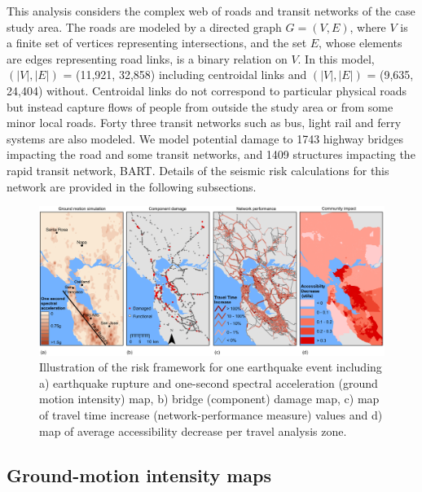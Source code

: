 This analysis considers the complex web of roads and transit networks of the case study area. The roads are modeled by a directed graph $G = (V, E)$, where $V$ is a finite set of vertices representing intersections, and the set $E$, whose elements are edges representing road links, is a binary relation on $V$. In this model, $(|V|, |E|)$ = (11,921, 32,858) including centroidal links and $(|V|, |E|)$ = (9,635, 24,404) without. Centroidal links do not correspond to particular physical roads but instead capture flows of people from outside the study area or from some minor local roads. Forty three transit networks such as bus, light rail and ferry systems are also modeled. We  model potential damage to 1743 highway bridges impacting the road and some transit networks, and 1409 structures impacting the rapid transit network, BART. Details of the seismic risk calculations for this network are provided in the following subsections.
%


\begin{figure}
\centering
\includegraphics[width=\textwidth]{FIGS/Mahalia_four_pannels204v5_cropped.pdf} %
\caption{Illustration of the risk framework for one earthquake event including a) earthquake rupture and one-second spectral acceleration (ground motion intensity) map, b) bridge (component) damage map, c) map of travel time increase (network-performance measure) values and d) map of average accessibility decrease per travel analysis zone.}
\label{fig:four_steps}\end{figure}

\subsection{Ground-motion intensity maps}
